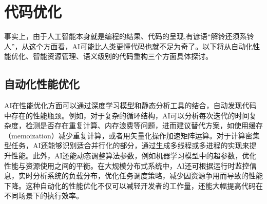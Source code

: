 \documentclass[supercite]{HustGraduPaper}
\begin{document}
	\tableofcontents
	
	\clearpage%
	
	\section{代码优化}
		事实上，由于人工智能本身就是编程的结果、代码的呈现,有谚语“解铃还须系铃人”，从这个方面看，AI可能比人类更懂代码也就不足为奇了。以下将从自动化性能优化、智能资源管理、语义级别的代码重构三个方面具体探讨。
	\subsection{自动化性能优化}
		AI在性能优化方面可以通过深度学习模型和静态分析工具的结合，自动发现代码中存在的性能瓶颈。例如，对于复杂的循环结构，AI可以分析每次迭代的时间复杂度，检测是否存在重复计算、内存浪费等问题，进而建议替代方案，如使用缓存（memoization）减少重复计算，或者用矢量化操作加速矩阵运算。对于计算密集型任务，AI还能够识别适合并行化的部分，通过生成多线程或多进程的实现来提升性能。此外，AI还能动态调整算法参数，例如机器学习模型中的超参数，优化性能与资源使用之间的平衡。在大规模分布式系统中，AI还可根据运行时监控信息，实时分析系统的负载分布，优化任务调度策略，减少因资源争用而导致的性能下降。这种自动化的性能优化不仅可以减轻开发者的工作量，还能大幅提高代码在不同场景下的执行效率。
\end{document}
